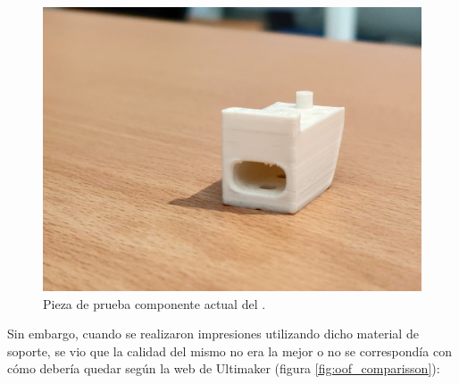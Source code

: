 \begin{figure}[H]
    \centering
    \includegraphics[width=.7\linewidth]{pictures/test_piece.jpg}
    \caption*{Pieza de prueba componente actual del \pArm{}.}
\end{figure}

Sin embargo, cuando se realizaron impresiones utilizando dicho material de soporte,
se vio que la calidad del mismo no era la mejor o no se correspondía con cómo debería
quedar según la web de Ultimaker (figura \ref{fig:oof_comparisson}):

